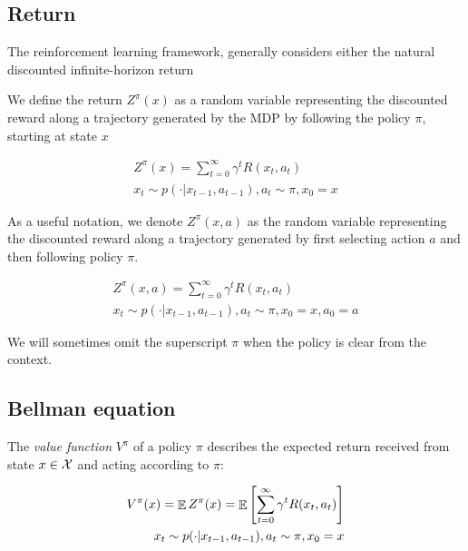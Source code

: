 
\subsection{Return}

The reinforcement learning framework, generally considers either the natural discounted infinite-horizon return 



We define the return $Z^\pi(x)$ as a random variable representing the discounted reward along a trajectory generated by the MDP by following the policy $\pi$, starting at state $x$

\begin{equation}
\begin{split}
Z^\pi(x)=\sum_{t=0}^\infty \gamma^tR(x_t,a_t)\\
x_t \sim p(\cdot|x_{t-1}, a_{t-1}), a_t \sim \pi, x_0 = x
\end{split}
\end{equation}

As a useful notation, we denote $Z^\pi(x, a)$ as the random variable representing the discounted reward along a trajectory generated by first selecting action $a$ and then following policy $\pi$.

\begin{equation}
\begin{split}
Z^\pi(x, a)=\sum_{t=0}^\infty \gamma^tR(x_t,a_t)\\
x_t \sim p(\cdot|x_{t-1}, a_{t-1}), a_t \sim \pi, x_0 = x, a_0 = a
\end{split}
\end{equation}

We will sometimes omit the superscript $\pi$ when the policy is clear from the context.

\subsection{Bellman equation}

The \textit{value function} $V^\pi$ of a policy $\pi$ describes the expected return received from state $x \in \mathcal{X}$ and acting according to $\pi$:

\begin{equation}
\begin{split}
V^\pi(x) = \mathop{\mathbb{E}} Z^\pi(x) = \mathop{\mathbb{E}}\left[\sum_{t=0}^\infty \gamma^tR(x_t,a_t) \right]\\
x_t \sim p(\cdot|x_{t-1}, a_{t-1}), a_t \sim \pi, x_0 = x
\end{split}
\end{equation}


